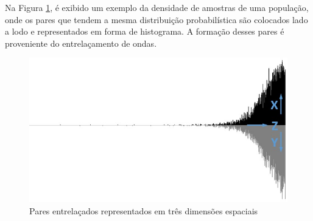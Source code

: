 Na Figura \ref{fig:consciousness_space_waves}, é exibido um exemplo da densidade de amostras de uma população, onde os pares que tendem a mesma distribuição probabilística são colocados lado a lodo e representados em forma de histograma. A formação desses pares é proveniente do entrelaçamento de ondas.
	\begin{figure}[H]
	\caption{Pares entrelaçados representados em três dimensões espaciais}
	\label{fig:consciousness_space_waves}
	\centering
	\includegraphics[scale=.7]{sections/images/consciousness_space_waves.jpg}
	\end{figure}

